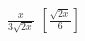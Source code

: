 \begin{esercizio}[\Ast]
\begin{multicols}{4}
\begin{enumeratea}
 \item $\frac x{3\sqrt{2x}}$
  \hfill $\left[\frac{\sqrt{2x}} 6\right]$
 \end{enumeratea}
 \end{multicols}
\end{esercizio}



